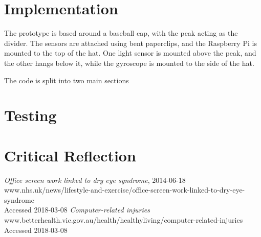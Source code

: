 \documentclass[12pt, a4paper]{report}
\begin{document}
\section{Implementation}

The prototype is based around a baseball cap, with the peak acting as the divider.
The sensors are attached using bent paperclips, and the Raspberry Pi is mounted to the top of the hat.
One light sensor is mounted above the peak, and the other hangs below it, while the gyroscope is mounted to the side of the hat.

\par

The code is split into two main sections

\section{Testing}

\section{Critical Reflection}

\begin{thebibliography}{0}
    \textit{Office screen work linked to dry eye syndrome}, 2014-06-18\\
    www.nhs.uk/news/lifestyle-and-exercise/office-screen-work-linked-to-dry-eye-syndrome\\
    Accessed 2018-03-08
    \textit{Computer-related injuries}\\
    www.betterhealth.vic.gov.au/health/healthyliving/computer-related-injuries\\
    Accessed 2018-03-08
\end{thebibliography}
\end{document}
